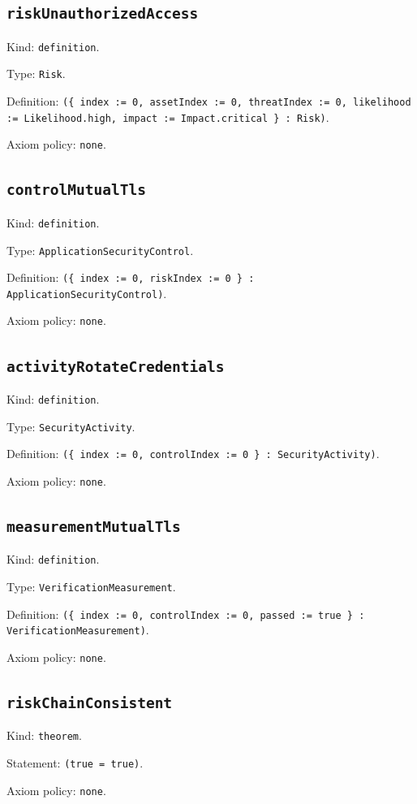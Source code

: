 \documentclass[11pt]{article}
\begin{document}
\subsection*{\texttt{riskUnauthorizedAccess}}
\noindent Kind: \texttt{definition}.\par
\noindent Type: \texttt{Risk}.\par
\noindent Definition: \texttt{(\{ index := 0, assetIndex := 0, threatIndex := 0, likelihood := Likelihood.high, impact := Impact.critical \} : Risk)}.\par
\noindent Axiom policy: \texttt{none}.\par
\subsection*{\texttt{controlMutualTls}}
\noindent Kind: \texttt{definition}.\par
\noindent Type: \texttt{ApplicationSecurityControl}.\par
\noindent Definition: \texttt{(\{ index := 0, riskIndex := 0 \} : ApplicationSecurityControl)}.\par
\noindent Axiom policy: \texttt{none}.\par
\subsection*{\texttt{activityRotateCredentials}}
\noindent Kind: \texttt{definition}.\par
\noindent Type: \texttt{SecurityActivity}.\par
\noindent Definition: \texttt{(\{ index := 0, controlIndex := 0 \} : SecurityActivity)}.\par
\noindent Axiom policy: \texttt{none}.\par
\subsection*{\texttt{measurementMutualTls}}
\noindent Kind: \texttt{definition}.\par
\noindent Type: \texttt{VerificationMeasurement}.\par
\noindent Definition: \texttt{(\{ index := 0, controlIndex := 0, passed := true \} : VerificationMeasurement)}.\par
\noindent Axiom policy: \texttt{none}.\par
\subsection*{\texttt{riskChainConsistent}}
\noindent Kind: \texttt{theorem}.\par
\noindent Statement: \texttt{(true = true)}.\par
\noindent Axiom policy: \texttt{none}.\par
\end{document}
